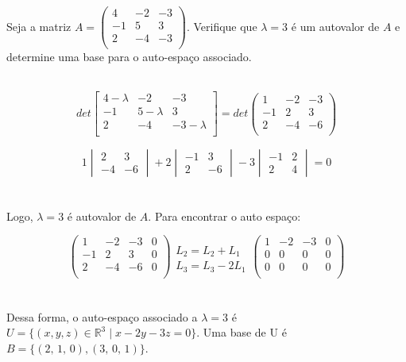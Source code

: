 \item Seja a matriz
$A = 
\begin{pmatrix}
	 4 & -2 & -3 \\
	-1 &  5 &  3 \\
	 2 & -4 & -3 \\ 
\end{pmatrix}
$.
Verifique que $\lambda = 3$ é um autovalor de $A$ e determine
uma base para o auto-espaço associado.
\\ \\
\solucao

$$det
\begin{bmatrix}
	 4 - \lambda & -2           & -3           \\
	-1           &  5 - \lambda &  3           \\
	 2           & -4           & -3 - \lambda \\ 
\end{bmatrix}
=
det
\begin{pmatrix}
	 1 & -2 & -3 \\
	-1 &  2 &  3 \\
	 2 & -4 & -6 \\ 
\end{pmatrix}
$$

$$
1 \begin{vmatrix}
	 2 &  3 \\
	-4 & -6
\end{vmatrix}
+ 2 \begin{vmatrix}
	-1 &  3 \\
	 2 & -6
\end{vmatrix}
-3 \begin{vmatrix}
	-1 &  2 \\
	 2 &  4 
\end{vmatrix}
= 0
$$
\\ \\
Logo, $\lambda = 3$ é autovalor de $A$. Para
encontrar o auto espaço:

$$
\begin{pmatrix}
	 1 & -2 & -3 & 0 \\
	-1 &  2 &  3 & 0 \\
	 2 & -4 & -6 & 0 \\ 
\end{pmatrix}
\begin{array}{c}
	\\
	L_2 = L_2 + L_1 \\
	L_3 = L_3 - 2L_1
\end{array}
\begin{pmatrix}
	 1 & -2 & -3 & 0 \\
	 0 &  0 &  0 & 0 \\
	 0 &  0 &  0 & 0 \\ 
\end{pmatrix}
$$
\\ \\
Dessa forma, o auto-espaço associado a $\lambda = 3$ é
$U = \{ (x, y, z) \in \mathbb{R}^3 \mid x - 2y -3z = 0\}$.
Uma base de U é $B = \{(2,\,1,\,0), (3,\,0,\,1)\}$.